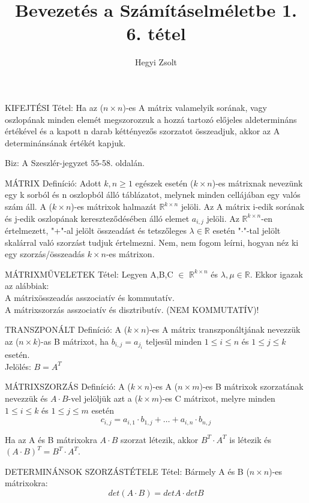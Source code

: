 \documentclass[]{article}
\title{Bevezetés a Számításelméletbe 1.\\{\large 6. tétel}}
\author{Hegyi Zsolt}
\newcommand{\R}{\mathbb{R}}
\newcommand{\Rn}[1]{$\mathbb{R}^{#1}$}
\begin{document}
\maketitle{}
\begin{framed}
KIFEJTÉSI Tétel: Ha az ($n \times n$)-es A mátrix valamelyik sorának, vagy oszlopának minden elemét megszorozzuk a hozzá tartozó előjeles aldetermináns értékével és a kapott n darab kéttényezős szorzatot összeadjuk, akkor az A determinánsának értékét kapjuk.
\end{framed}
\begin{leftbar}
Biz: A Szeszlér-jegyzet 55-58. oldalán.
\end{leftbar}
\begin{shaded}
MÁTRIX Definíció: Adott $k,n\geq1$ egészek esetén ($k\times n$)-es mátrixnak nevezünk egy k sorból és n oszlopból álló táblázatot, melynek minden cellájában egy valós szám áll. A ($k\times n$)-es mátrixok halmazát \Rn{k\times n} jelöli. Az A mátrix i-edik sorának és j-edik oszlopának kereszteződésében álló elemet $a_{i,j}$ jelöli. Az \Rn{k\times n}-en értelmezett, "+"-al jelölt összeadást és tetszőleges $\lambda \in \R$ esetén "$\cdot$"-tal jelölt skalárral való szorzást tudjuk értelmezni. Nem, nem fogom leírni, hogyan néz ki egy szorzás/összeadás $k \times n$-es mátrixon.
\end{shaded}
\begin{framed}
MÁTRIXMŰVELETEK Tétel: Legyen A,B,C $\in$ \Rn{k\times n} és $\lambda, \mu \in \R$. Ekkor igazak az alábbiak:\\
A mátrixösszeadás asszociatív és kommutatív.\\
A mátrixszorzás asszociatív és disztributív. (NEM KOMMUTATÍV)!
\end{framed}
\begin{shaded}
TRANSZPONÁLT Definíció: A ($k\times n$)-es A mátrix transzponáltjának nevezzük az ($n\times k$)-as B mátrixot, ha $b_{i,j} = a_{j_i}$ teljesül minden $1 \leq i \leq n$ és $1 \leq j \leq k$ esetén.\\
Jelölés: $B = A^T$
\end{shaded}
\begin{shaded}
MÁTRIXSZORZÁS Definíció: A ($k\times n$)-es A ($n\times m$)-es B mátrixok szorzatának nevezzük és $A\cdot B$-vel jelöljük azt a ($k\times m$)-es C mátrixot, melyre minden $1 \leq i \leq k$ és $1 \leq j \leq m$ esetén
$$c_{i,j} = a_{i,1}\cdot b_{1, j}+\ldots+a_{i,n}\cdot b_{n,j}$$
\end{shaded}
Ha az A és B mátrixokra $A \cdot B$ szorzat létezik, akkor $B^T \cdot A^T$ is létezik és $(A\cdot B)^T = B^T \cdot A^T$.
\begin{framed}
DETERMINÁNSOK SZORZÁSTÉTELE Tétel: Bármely A és B ($n\times n$)-es mátrixokra: $$det(A\cdot B)=detA \cdot detB$$
\end{framed}
\end{document}
